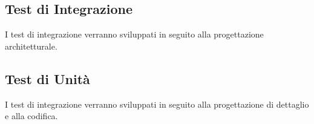 
\subsection{Test di Integrazione}
I test di integrazione verranno sviluppati in seguito alla progettazione architetturale.

\subsection{Test di Unità}
I test di integrazione verranno sviluppati in seguito alla progettazione di dettaglio e alla codifica.
